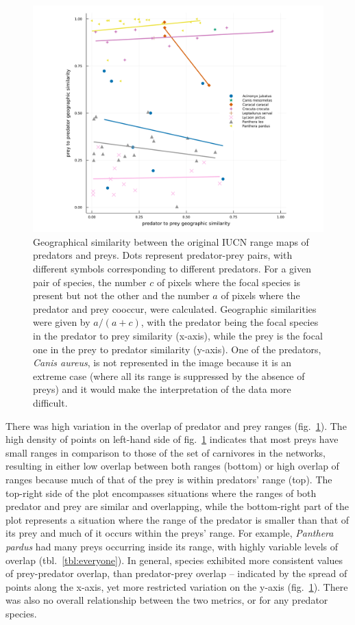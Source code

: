 \documentclass[10pt,oneside]{article}
\makeatletter
\def\maxwidth{\ifdim\Gin@nat@width>\linewidth\linewidth
\else\Gin@nat@width\fi}
\let\Oldincludegraphics\includegraphics
\renewcommand{\includegraphics}[1]{\Oldincludegraphics[width=\maxwidth]{#1}}
\makeatother
\begin{document}
\begin{figure}
\hypertarget{fig:geo_diss}{%
\centering
\includegraphics{figures/beta-div_pred-species.png}
\caption{Geographical similarity between the original IUCN range maps of
predators and preys. Dots represent predator-prey pairs, with different
symbols corresponding to different predators. For a given pair of
species, the number \(c\) of pixels where the focal species is present
but not the other and the number \(a\) of pixels where the predator and
prey cooccur, were calculated. Geographic similarities were given by
\(a/(a+c)\), with the predator being the focal species in the predator
to prey similarity (x-axis), while the prey is the focal one in the prey
to predator similarity (y-axis). One of the predators, \emph{Canis
aureus}, is not represented in the image because it is an extreme case
(where all its range is suppressed by the absence of preys) and it would
make the interpretation of the data more difficult.}\label{fig:geo_diss}
}
\end{figure}

There was high variation in the overlap of predator and prey ranges
(fig.~\ref{fig:geo_diss}). The high density of points on left-hand side
of fig.~\ref{fig:geo_diss} indicates that most preys have small ranges
in comparison to those of the set of carnivores in the networks,
resulting in either low overlap between both ranges (bottom) or high
overlap of ranges because much of that of the prey is within predators'
range (top). The top-right side of the plot encompasses situations where
the ranges of both predator and prey are similar and overlapping, while
the bottom-right part of the plot represents a situation where the range
of the predator is smaller than that of its prey and much of it occurs
within the preys' range. For example, \emph{Panthera pardus} had many
preys occurring inside its range, with highly variable levels of overlap
(tbl.~\ref{tbl:everyone}). In general, species exhibited more consistent
values of prey-predator overlap, than predator-prey overlap -- indicated
by the spread of points along the x-axis, yet more restricted variation
on the y-axis (fig.~\ref{fig:geo_diss}). There was also no overall
relationship between the two metrics, or for any predator species.
\end{document}
